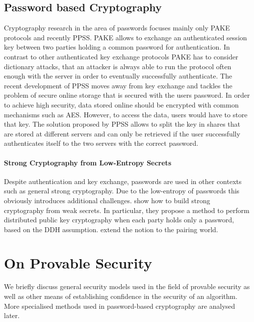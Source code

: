 \subsection{Password based Cryptography}
Cryptography research in the area of passwords focuses mainly only \ac{PAKE} protocols and recently \ac{PPSS}.
\ac{PAKE} allows to exchange an authenticated session key between two parties holding a common password for authentication.
In contrast to other authenticated key exchange protocols \ac{PAKE} has to consider dictionary attacks, \ie that an attacker is always able to run the protocol often enough with the server in order to eventually successfully authenticate.
The recent development of \ac{PPSS} moves away from key exchange and tackles the problem of secure online storage that is secured with the users password.
In order to achieve high security, data stored online should be encrypted with common mechanisms such as \ac{AES}.
However, to access the data, users would have to store that key.
The solution proposed by \ac{PPSS} allows to split the key in shares that are stored at different servers and can only be retrieved if the user successfully authenticates itself to the two servers with the correct password.


\paragraph{Strong Cryptography from Low-Entropy Secrets}
Despite authentication and key exchange, passwords are used in other contexts such as general strong cryptography.
Due to the low-entropy of passwords this obviously introduces additional challenges.
\citet{AbdallaBCP09} show how to build strong cryptography from weak secrets.
In particular, they propose a method to perform distributed public key cryptography when each party holds only a password, based on the \acl{DDH} assumption.
\citet{BoyenCFP10} extend the notion to the pairing world.



\section{On Provable Security}
We briefly discuss general security models used in the field of provable security as well as other means of establishing confidence in the security of an algorithm.
More specialised methods used in password-based cryptography are analysed later.


